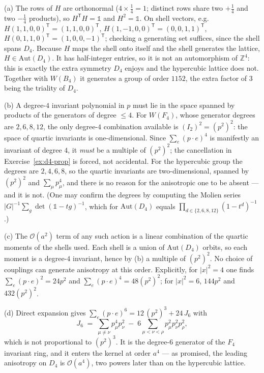{(a) The rows of $H$ are orthonormal ($4\times\tfrac14=1$; distinct rows share
two $+\tfrac14$ and two $-\tfrac14$ products), so $H^\mathsf{T}H=\mathbb{1}$ and
$H^2=\mathbb{1}$. On shell vectors, e.g.
$H(1,1,0,0)^\mathsf{T}=(1,1,0,0)^\mathsf{T}$,
$H(1,-1,0,0)^\mathsf{T}=(0,0,1,1)^\mathsf{T}$,
$H(0,1,1,0)^\mathsf{T}=(1,0,0,-1)^\mathsf{T}$; checking a generating set
suffices, since the shell spans $D_4$. Because $H$ maps the shell onto itself
and the shell generates the lattice, $H\in\mathrm{Aut}(D_4)$. It has
half-integer entries, so it is not an automorphism of $\mathbb{Z}^4$: this is
exactly the extra symmetry $D_4$ enjoys and the hypercubic lattice does not.
Together with $W(B_4)$ it generates a group of order $1152$, the extra factor of
$3$ being the triality of $D_4$.

(b) A degree-$4$ invariant polynomial in $p$ must lie in the space spanned by
products of the generators of degree $\le 4$. For $W(F_4)$, whose generator
degrees are $2,6,8,12$, the only degree-$4$ combination available is
$(I_2)^2 = (p^2)^2$: the space of quartic invariants is one-dimensional. Since
$\sum_e (p\!\cdot\!e)^4$ is manifestly an invariant of degree $4$, it
\emph{must} be a multiple of $(p^2)^2$; the cancellation in
Exercise~\ref{ex:d4-prop} is forced, not accidental. For the hypercubic group
the degrees are $2,4,6,8$, so the quartic invariants are two-dimensional,
spanned by $(p^2)^2$ and $\sum_\mu p_\mu^4$, and there is no reason for the
anisotropic one to be absent --- and it is not. (One may confirm the degrees by
computing the Molien series
$|G|^{-1}\sum_{g}\det(\mathbb{1}-tg)^{-1}$, which for $\mathrm{Aut}(D_4)$
equals $\prod_{d\in\{2,6,8,12\}}(1-t^{d})^{-1}$.)

(c) The $\mathcal{O}(a^2)$ term of any such action is a linear combination of
the quartic moments of the shells used. Each shell is a union of
$\mathrm{Aut}(D_4)$ orbits, so each moment is a degree-$4$ invariant, hence by
(b) a multiple of $(p^2)^2$. No choice of couplings can generate anisotropy at
this order. Explicitly, for $|x|^2=4$ one finds $\sum_e (p\!\cdot\!e)^2=24p^2$
and $\sum_e (p\!\cdot\!e)^4=48(p^2)^2$; for $|x|^2=6$, $144p^2$ and
$432(p^2)^2$.

(d) Direct expansion gives
$\sum_e (p\!\cdot\!e)^6 = 12\,(p^2)^3 + 24\,J_6$ with
\begin{equation}
  J_6 \;=\; \sum_{\mu\neq\nu} p_\mu^4 p_\nu^2
        \;-\; 6\!\!\sum_{\mu<\nu<\rho}\!\! p_\mu^2p_\nu^2p_\rho^2 ,
\end{equation}
which is not proportional to $(p^2)^3$. It is the degree-$6$ generator of the
$F_4$ invariant ring, and it enters the kernel at order $a^4$ --- as promised,
the leading anisotropy on $D_4$ is $\mathcal{O}(a^4)$, two powers later than on
the hypercubic lattice.}

